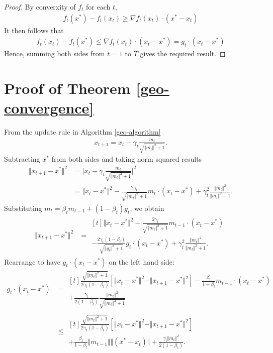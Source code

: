 \documentclass{article}
\begin{document}
\begin{proof}
By converxity of $f_t$ for each $t$,
\begin{align*}
f_t(x^*) - f_t(x_t) \ge \nabla f_t (x_t) \cdot (x^* - x_t)
\end{align*}
It then follows that
\begin{align*}
 f_t(x_t) - f_t(x^*) \le \nabla f_t (x_t) \cdot (x_t - x^*) = g_t \cdot (x_t - x^*)
\end{align*}
Hence, summing both sides from $t=1$ to $T$ gives the required result.
\end{proof}

\section{Proof of Theorem \ref{geo-convergence}}\label{convergence-proof}
From the update rule in Algorithm \ref{geo-algorithm}
\begin{align*}
x_{t+1} = x_t - \gamma_t \frac{m_t}{\sqrt{\Vert m_t\Vert^2 +1}}.
\end{align*}
Subtracting $x^*$ from both sides and taking norm squared results
\begin{align*}
\Vert x_{t+1} - x^*\Vert^2 &= \vert x_t - \gamma_t \frac{m_t}{\sqrt{\Vert m_t\Vert^2 +1}} \vert^2\\
        &= \Vert x_{t} - x^*\Vert^2 -\frac{2\gamma_t}{\sqrt{\Vert m_t\Vert^2 +1}}
        m_t \cdot (x_t - x^*) + \gamma_t^2 \frac{\Vert m_t\Vert^2}{\Vert m_t\Vert^2 + 1}.
\end{align*}
Substituting $m_t = \beta_t m_{t-1} +  (1-\beta_t) g_t $, we obtain
\begin{align*}
\Vert x_{t+1} - x^*\Vert^2 &=
\begin{multlined}[t]
\Vert x_{t} - x^*\Vert^2 -\frac{2\gamma_t}{\sqrt{\Vert m_t\Vert^2 +1}} m_{t-1} \cdot (x_t - x^*)\\
- 
\frac{2\gamma_t (1-\beta_t)}{\sqrt{\Vert g_t\Vert^2 +1}} g_{t} \cdot (x_t - x^*)
+ \gamma_t^2 \frac{\Vert m_t\Vert^2}{\Vert m_t\Vert^2 + 1}.
\end{multlined}
\end{align*}
Rearrange to have $g_t\cdot (x_t - x^*)$ on the left hand side:
\begin{align}
g_t\cdot (x_t - x^*) &= \begin{multlined}[t]
\frac{\sqrt{\Vert m_t\Vert^2+1}}{2\gamma_t (1-\beta_t)}
\left[\Vert x_t-x^*\Vert^2 - \Vert x_{t+1} -x^*\Vert^2\right]
-
\frac{\beta_t}{1-\beta_t} m_{t-1} \cdot (x_t-x^*) \\
+ \frac{\gamma_t}{2(1-\beta_t)} \frac{\Vert m_t\Vert^2}{\sqrt{\Vert m_t \Vert^2+1}}
\end{multlined} \nonumber\\
& \le 
\begin{multlined}[t]
\frac{\sqrt{\Vert m_t\Vert^2+1}}{2\gamma_t (1-\beta_t)}
\left[\Vert x_t-x^*\Vert^2 - \Vert x_{t+1} -x^*\Vert^2\right]\\
+
\frac{\beta_t}{1-\beta_t} \Vert m_{t-1}\Vert \Vert (x^*-x_t)\Vert
+ \frac{\gamma_t \Vert m_t\Vert^2}{2(1-\beta_t) }. \label{Cauchy-S}
\end{multlined}
\end{align}
\end{document}
